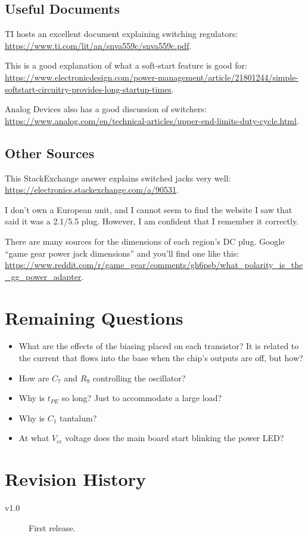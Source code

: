 \documentclass{article}
\newcommand{\Vcc}{$V_{cc}$}
\begin{document}
\subsection{Useful Documents}
TI hosts an excellent document explaining switching regulators:
\url{https://www.ti.com/lit/an/snva559c/snva559c.pdf}.

This is a good explanation of what a soft-start feature is good for:
\url{https://www.electronicdesign.com/power-management/article/21801244/simple-softstart-circuitry-provides-long-startup-times}.

Analog Devices also has a good discussion of switchers:
\url{https://www.analog.com/en/technical-articles/upper-end-limits-duty-cycle.html}.

\subsection{Other Sources}
\label{sec:other_sources}
This Stack\-Ex\-change answer explains switched jacks very well:
\url{https://electronics.stackexchange.com/a/90531}.

I don't own a European unit, and I cannot seem to find the website I
saw that said it was a 2.1/5.5 plug. However, I am confident that I
remember it correctly.

There are many sources for the dimensions of each region's DC
plug. Google ``game gear power jack dimensions'' and you'll find one
like this:
\url{https://www.reddit.com/r/game_gear/comments/gh6psb/what_polarity_is_the_gg_power_adapter}.

\section{Remaining Questions}
\label{sec:remaining_questions}
\begin{itemize}
\item What are the effects of the biasing placed on each transistor?
  It is related to the current that flows into the base when the
  chip's outputs are off, but how?
\item How are $C_7$ and $R_9$ controlling the oscillator?
\item Why is $t_{PE}$ so long? Just to accommodate a large load?
\item Why is $C_1$ tantalum?
\item At what \Vcc{} voltage does the main board start blinking the
  power LED?
\end{itemize}

\section{Revision History}
\begin{description}
\item[v1.0] First release.
\end{description}
\end{document}
